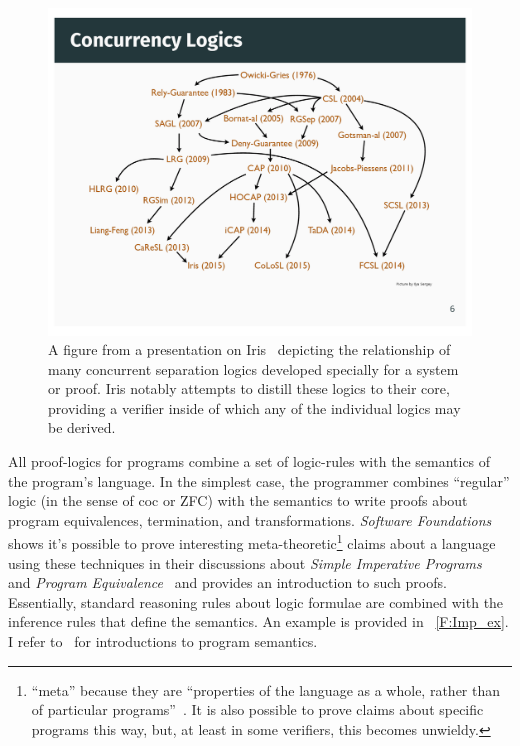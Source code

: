\begin{figure}
    \centering
    \includegraphics[width=\textwidth]{img/iris_2_0_concurrent_logics}
    \caption{A figure from a presentation on Iris~\cite{Jung_2016_slides}
    depicting the relationship of many concurrent separation logics developed
    specially for a system or proof. Iris notably attempts to distill these
    logics to their core, providing a verifier inside of which any of the
    individual logics may be derived.}\label{F:iris_complex}
\end{figure}

All proof-logics for programs combine a set of logic-rules with the semantics of
the program's language. In the simplest case, the programmer combines
``regular'' logic (in the sense of \gls{coc} or ZFC) with the semantics to write
proofs about program equivalences, termination, and transformations.
\emph{Software Foundations} shows it's possible to prove interesting
meta-theoretic\footnote{``meta'' because they are ``properties of the language
as a whole, rather than of particular programs''~\cite{Pierce:SF2}. It is also
possible to prove claims about specific programs this way, but, at least in some
verifiers, this becomes unwieldy.} claims about a language using these techniques
in their discussions about \emph{Simple Imperative Programs}~\cite{Pierce:SF1}
and \emph{Program Equivalence}~\cite{Pierce:SF2} and provides an introduction to
such proofs. Essentially, standard reasoning rules about logic formulae are
combined with the inference rules that define the semantics. An example is
provided in \figurename~\ref{F:Imp_ex}. I refer
to~\cite{Winskel_1993,Harper_2016} for introductions to program semantics.

